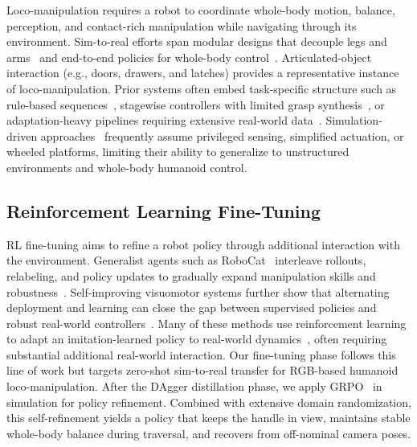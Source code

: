 Loco-manipulation requires a robot to coordinate whole-body motion, balance, perception, and contact-rich manipulation while navigating through its environment. Sim-to-real efforts span modular designs that decouple legs and arms~\citep{liu2024visual,ben2025homie,cheng2024express} and end-to-end policies for whole-body control~\citep{ha2024umi,pan2025roboduet,he2024omnih2o}. Articulated-object interaction (e.g., doors, drawers, and latches) provides a representative instance of loco-manipulation. Prior systems often embed task-specific structure such as rule-based sequences~\citep{oh2017technical,calvert2025behavior}, stagewise controllers with limited grasp synthesis~\citep{lee2025stageact}, or adaptation-heavy pipelines requiring extensive real-world data~\citep{xiong2024adaptive}. Simulation-driven approaches~\citep{urakami2019doorgym,traverse-doors-2025,weng2025hdmi} frequently assume privileged sensing, simplified actuation, or wheeled platforms, limiting their ability to generalize to unstructured environments and whole-body humanoid control.

\subsection{Reinforcement Learning Fine-Tuning}

RL fine-tuning aims to refine a robot policy through additional interaction with the environment. Generalist agents such as RoboCat~\citep{robocat} interleave rollouts, relabeling, and policy updates to gradually expand manipulation skills and robustness~\citep{robocat}. Self-improving visuomotor systems further show that alternating deployment and learning can close the gap between supervised policies and robust real-world controllers~\citep{medals,sime}. Many of these methods use reinforcement learning to adapt an imitation-learned policy to real-world dynamics~\citep{johannink2019residual,ankile2024resip,xiao2025pld}, often requiring substantial additional real-world interaction. Our fine-tuning phase follows this line of work but targets zero-shot sim-to-real transfer for RGB-based humanoid loco-manipulation. After the DAgger distillation phase, we apply GRPO~\citep{grpo2024} in simulation for policy refinement. Combined with extensive domain randomization, this self-refinement yields a policy that keeps the handle in view, maintains stable whole-body balance during traversal, and recovers from off-nominal camera poses.